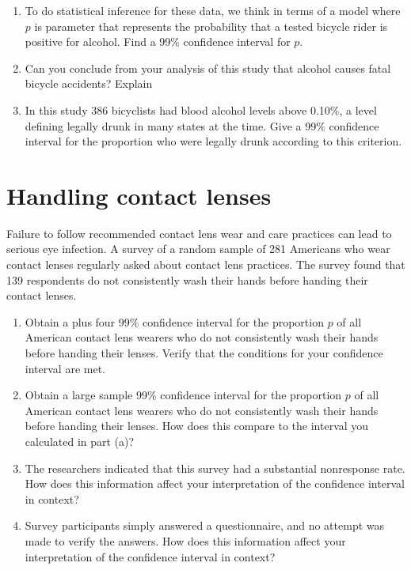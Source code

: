 \documentclass[letterpaper,11pt,twoside,]{pinp}
\providecommand{\tightlist}{%
  \setlength{\itemsep}{0pt}\setlength{\parskip}{0pt}}
\begin{document}
\begin{enumerate}
\def\labelenumi{\alph{enumi}.}
\tightlist
\item
  To do statistical inference for these data, we think in terms of a
  model where \(p\) is parameter that represents the probability that a
  tested bicycle rider is positive for alcohol. Find a 99\% confidence
  interval for \(p\).
\item
  Can you conclude from your analysis of this study that alcohol causes
  fatal bicycle accidents? Explain
\item
  In this study 386 bicyclists had blood alcohol levels above 0.10\%, a
  level defining legally drunk in many states at the time. Give a 99\%
  confidence interval for the proportion who were legally drunk
  according to this criterion.
\end{enumerate}

\hypertarget{handling-contact-lenses}{%
\section{Handling contact lenses}\label{handling-contact-lenses}}

Failure to follow recommended contact lens wear and care practices can
lead to serious eye infection. A survey of a random sample of 281
Americans who wear contact lenses regularly asked about contact lens
practices. The survey found that 139 respondents do not consistently
wash their hands before handing their contact lenses.

\begin{enumerate}
\def\labelenumi{\alph{enumi}.}
\tightlist
\item
  Obtain a plus four 99\% confidence interval for the proportion \(p\)
  of all American contact lens wearers who do not consistently wash
  their hands before handing their lenses. Verify that the conditions
  for your confidence interval are met.
\item
  Obtain a large sample 99\% confidence interval for the proportion
  \(p\) of all American contact lens wearers who do not consistently
  wash their hands before handing their lenses. How does this compare to
  the interval you calculated in part (a)?
\item
  The researchers indicated that this survey had a substantial
  nonresponse rate. How does this information affect your interpretation
  of the confidence interval in context?
\item
  Survey participants simply answered a questionnaire, and no attempt
  was made to verify the answers. How does this information affect your
  interpretation of the confidence interval in context?
\end{enumerate}
\end{document}
